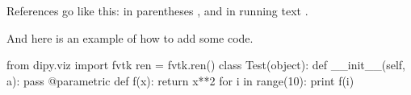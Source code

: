 \documentclass{bioinfo}
\begin{document}
References go like this: in parentheses \citep{Garyfallidis_thesis, Mori1999}, and in running text \citet{Garyfallidis_thesis}.

And here is an example of how to add some code.

\begin{python}
from dipy.viz import fvtk
ren = fvtk.ren()
class Test(object):
  def __init__(self, a):
    pass
@parametric
def f(x):
  return x**2
for i in range(10):
  print f(i)
\end{python}


%

%
%
%
%

\end{document}
